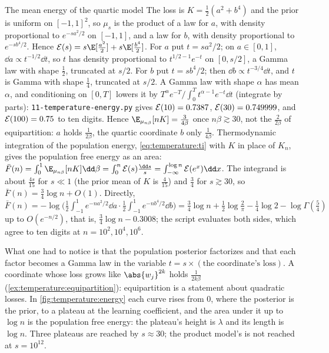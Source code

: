 \begin{refsection}
\begin{computation}{The mean energy of the quartic model}\label{comp:temperature:quartic}
\step The loss is $K=\frac12(a^2+b^4)$ and the prior is uniform on $[-1,1]^2$, so $\mu_s$ is the product of a law for $a$, with density proportional to $e^{-sa^2/2}$ on $[-1,1]$, and a law for $b$, with density proportional to $e^{-sb^4/2}$. Hence $\temperatureE(s)=s\E[\frac{a^2}2]+s\E[\frac{b^4}2]$.
\step For $a$ put $t=sa^2/2$; on $a\in[0,1]$, $\dd a\propto t^{-1/2}\dd t$, so $t$ has density proportional to $t^{1/2-1}e^{-t}$ on $[0,s/2]$, a Gamma law with shape $\frac12$, truncated at $s/2$. For $b$ put $t=sb^4/2$; then $\dd b\propto t^{-3/4}\dd t$, and $t$ is Gamma with shape $\frac14$, truncated at $s/2$. A Gamma law with shape $\alpha$ has mean $\alpha$, and conditioning on $[0,T]$ lowers it by $T^\alpha e^{-T}/\int_0^Tt^{\alpha-1}e^{-t}\dd t$ (integrate by parts): \texttt{11-temperature-energy.py} gives $\mathcal{E}(10)=0.7387$, $\mathcal{E}(30)=0.749999$, and $\mathcal{E}(100)=0.75$ to ten digits.
\step Hence $\E_{\mu_{n\beta}}[nK]=\frac{3}{4\beta}$ once $n\beta\gtrsim30$, not the $\frac{2}{2\beta}$ of equipartition: $a$ holds $\frac1{2\beta}$, the quartic coordinate $b$ only $\frac1{4\beta}$.
\step Thermodynamic integration of the population energy, \eqref{eq:temperature:ti} with $K$ in place of $K_n$, gives the population free energy as an area: $\bar F(n)=\int_0^1\E_{\mu_{n\beta}}[nK]\dd\beta=\int_0^n\temperatureE(s)\frac{\dd s}s=\int_{-\infty}^{\log n}\temperatureE(e^x)\dd x$. The integrand is about $\frac{4s}{15}$ for $s\ll1$ (the prior mean of $K$ is $\frac4{15}$) and $\frac34$ for $s\gtrsim30$, so $\bar F(n)=\frac34\log n+O(1)$. Directly, $\bar F(n)=-\log\bigl(\frac12\int_{-1}^1e^{-na^2/2}\dd a\cdot\frac12\int_{-1}^1e^{-nb^4/2}\dd b\bigr)=\frac34\log n+\frac12\log\frac2\pi-\frac14\log2-\log\Gamma(\frac54)$ up to $O(e^{-n/2})$, that is, $\frac34\log n-0.3008$; the script evaluates both sides, which agree to ten digits at $n=10^2,10^4,10^6$.
\end{computation}

What one had to notice is that the population posterior factorizes and that each factor becomes a Gamma law in the variable $t=s\times(\text{the coordinate's loss})$. A coordinate whose loss grows like $\abs{w_j}^{2k}$ holds $\frac1{2k\beta}$ (\cref{ex:temperature:equipartition}): equipartition is a statement about quadratic losses. In \cref{fig:temperature:energy} each curve rises from $0$, where the posterior is the prior, to a plateau at the learning coefficient, and the area under it up to $\log n$ is the population free energy: the plateau's height is $\lambda$ and its length is $\log n$. Three plateaus are reached by $s\approx30$; the product model's is not reached at $s=10^{12}$.


\end{refsection}
